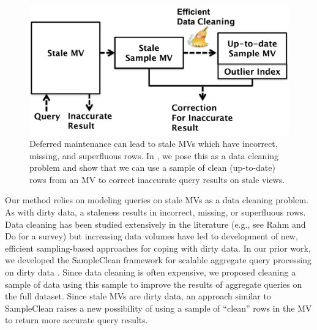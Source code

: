 
\begin{figure}[t] \vspace{-2em}
\centering
 \includegraphics[scale=0.27]{figs/sys-arch.pdf} \vspace{-.25em}
 \caption{Deferred maintenance can lead to stale MVs which have incorrect, missing, and superfluous rows. In \svc, we pose this as a data cleaning problem and show that we can use a sample of clean (up-to-date) rows from an MV to correct inaccurate query results on stale views. \label{sys-arch}}\vspace{-1.75em}
\end{figure}

Our method relies on modeling queries on stale MVs as a data cleaning problem.
As with dirty data, a staleness results in incorrect, missing, or superfluous rows.
Data cleaning has been studied extensively in the literature (e.g., see Rahm and Do for a survey\cite{rahm2000data}) but increasing data volumes have led to development of new, efficient sampling-based approaches for coping with dirty data.   
In our prior work, we developed the SampleClean framework for scalable aggregate query processing on dirty data \cite{wang1999sample}.
Since data cleaning is often expensive, we proposed cleaning a sample of data using this sample to improve the results of aggregate queries on the full dataset.
Since stale MVs are dirty data, an approach similar to SampleClean raises a new possibility of using a sample of ``clean'' rows in the MV to return more accurate query results.

